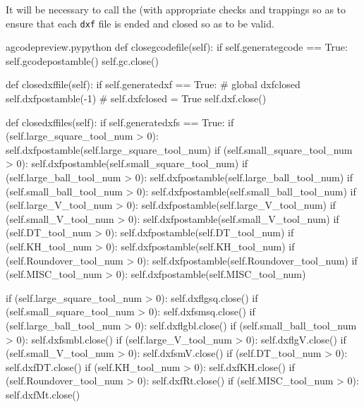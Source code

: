 \documentclass{ltxdoc}
\begin{document}
It will be necessary to call the  (with appropriate checks and trappings so as to ensure that each \verb|dxf| file is ended and closed so as to be valid.
 
\lstset{firstnumber=\thegcpy}
\begin{writecode}{a}{gcodepreview.py}{python}
    def closegcodefile(self):
        if self.generategcode == True:
            self.gcodepostamble()
            self.gc.close()

    def closedxffile(self):
        if self.generatedxf == True:
#            global dxfclosed
            self.dxfpostamble(-1)
#            self.dxfclosed = True
            self.dxf.close()
    
    def closedxffiles(self):
        if self.generatedxfs == True:
            if (self.large_square_tool_num > 0):
                self.dxfpostamble(self.large_square_tool_num)
            if (self.small_square_tool_num > 0):
                self.dxfpostamble(self.small_square_tool_num)
            if (self.large_ball_tool_num > 0):
                self.dxfpostamble(self.large_ball_tool_num)
            if (self.small_ball_tool_num > 0):
                self.dxfpostamble(self.small_ball_tool_num)
            if (self.large_V_tool_num > 0):
                self.dxfpostamble(self.large_V_tool_num)
            if (self.small_V_tool_num > 0):
                self.dxfpostamble(self.small_V_tool_num)
            if (self.DT_tool_num > 0):
                self.dxfpostamble(self.DT_tool_num)
            if (self.KH_tool_num > 0):
                self.dxfpostamble(self.KH_tool_num)
            if (self.Roundover_tool_num > 0):
                self.dxfpostamble(self.Roundover_tool_num)
            if (self.MISC_tool_num > 0):
                self.dxfpostamble(self.MISC_tool_num)
                
            if (self.large_square_tool_num > 0):
                self.dxflgsq.close()
            if (self.small_square_tool_num > 0):
                self.dxfsmsq.close()
            if (self.large_ball_tool_num > 0):
                self.dxflgbl.close()
            if (self.small_ball_tool_num > 0):
                self.dxfsmbl.close()
            if (self.large_V_tool_num > 0):
                self.dxflgV.close()
            if (self.small_V_tool_num > 0):
                self.dxfsmV.close()
            if (self.DT_tool_num > 0):
                self.dxfDT.close()
            if (self.KH_tool_num > 0):
                self.dxfKH.close()
            if (self.Roundover_tool_num > 0):
                self.dxfRt.close()
            if (self.MISC_tool_num > 0):
                self.dxfMt.close()

\end{writecode}
\addtocounter{gcpy}{56}
%
\end{document}
